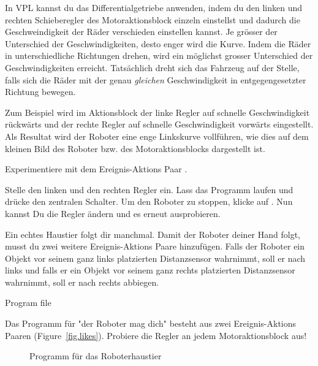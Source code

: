 In VPL kannst du das Differentialgetriebe anwenden, indem du den linken und rechten Schieberegler des Motoraktionsblock einzeln einstellst und dadurch die Geschweindigkeit der Räder verschieden einstellen kannst.
Je grösser der Unterschied der Geschwindigkeiten,
desto enger wird die Kurve. Indem die Räder in unterschiedliche Richtungen drehen,
wird ein möglichst grosser Unterschied der Geschwindigkeiten erreicht. 
Tatsächlich dreht sich das Fahrzeug auf der Stelle, 
falls sich die Räder mit der genau \emph{gleichen} 
Geschwindigkeit in entgegengesetzter Richtung bewegen.

Zum Beispiel wird im Aktionsblock  der linke Regler auf schnelle Geschwindigkeit rückwärts 
und der rechte Regler auf schnelle Geschwindigkeit vorwärts eingestellt. 
Als Resultat wird der Roboter eine enge Linkskurve vollführen, 
wie dies auf dem kleinen Bild des Roboter bzw. des Motoraktionsblocks dargestellt ist.

Experimentiere mit dem Ereignis-Aktions Paar .

Stelle den linken und den rechten Regler ein.
Lass das Programm laufen und drücke den zentralen Schalter.
Um den Roboter zu stoppen, klicke auf .
Nun kannst Du die Regler ändern und es erneut ausprobieren.



Ein echtes Haustier folgt dir manchmal.
Damit der Roboter deiner Hand folgt,
musst du zwei weitere Ereignis-Aktions Paare hinzufügen.
Falls der Roboter ein Objekt vor seinem
ganz links platzierten Distanzsensor wahrnimmt,
soll er nach links und falls er ein Objekt
vor seinem ganz rechts platzierten Distanzsensor wahrnimmt, soll er nach rechts abbiegen.

{\raggedleft \hfill Program file }

Das Programm für "der Roboter mag dich"  besteht aus zwei Ereignis-Aktions Paaren
(Figure~\cref{fig.likes}).
Probiere die Regler an jedem Motoraktionsblock aus!

\begin{figure}
	\hfill
	\caption{Programm für das Roboterhaustier}
\end{figure}

